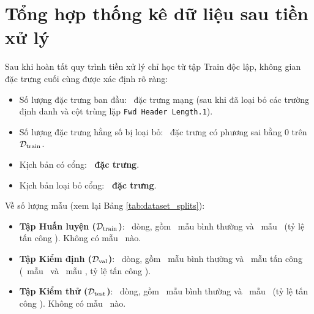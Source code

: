 
\section{Tổng hợp thống kê dữ liệu sau tiền xử lý}

Sau khi hoàn tất quy trình tiền xử lý chỉ học từ tập Train độc lập, không gian đặc trưng cuối cùng được xác định rõ ràng:
\begin{itemize}
    \item Số lượng đặc trưng ban đầu: \FeatInitialCount\ đặc trưng mạng (sau khi đã loại bỏ các trường định danh và cột trùng lặp \texttt{Fwd Header Length.1}).
    \item Số lượng đặc trưng hằng số bị loại bỏ: \FeatConstantDropped\ đặc trưng có phương sai bằng 0 trên $\mathcal{D}_{\text{train}}$.
    \item Kịch bản có cổng: \textbf{\FeatWithPortCount\ đặc trưng}.
    \item Kịch bản loại bỏ cổng: \textbf{\FeatWithoutPortCount\ đặc trưng}.
\end{itemize}

Về số lượng mẫu (xem lại Bảng \ref{tab:dataset_splits}):
\begin{itemize}
    \item \textbf{Tập Huấn luyện ($\mathcal{D}_{\text{train}}$)}: \DataTrainRows\ dòng, gồm \DataTrainBenign\ mẫu bình thường và \DataTrainFTP\ mẫu \FTP\ (tỷ lệ tấn công \DataTrainAttackPercent). Không có mẫu \SSH\ nào.
    \item \textbf{Tập Kiểm định ($\mathcal{D}_{\text{val}}$)}: \DataValidationRows\ dòng, gồm \DataValidationBenign\ mẫu bình thường và \DataValidationAttack\ mẫu tấn công (\DataValidationFTP\ mẫu \FTP\ và \DataValidationSSH\ mẫu \SSH, tỷ lệ tấn công \DataValidationAttackPercent).
    \item \textbf{Tập Kiểm thử ($\mathcal{D}_{\text{test}}$)}: \DataTestRows\ dòng, gồm \DataTestBenign\ mẫu bình thường và \DataTestAttack\ mẫu \SSH\ (tỷ lệ tấn công \DataTestAttackPercent). Không có mẫu \FTP\ nào.
\end{itemize}
